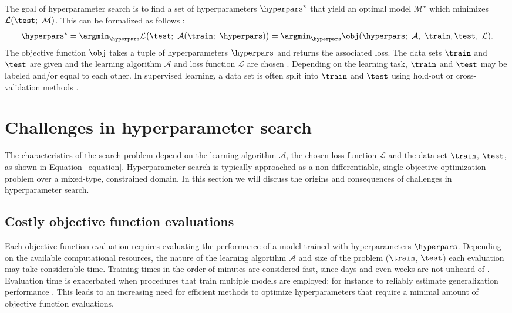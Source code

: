 The goal of hyperparameter search is to find a set of hyperparameters $\hyperpars^\star$ that yield an optimal model $\mathcal{M}^\star$ which minimizes $\mathcal{L}(\test;\ \mathcal{M})$. This can be formalized as follows \citep{claesen2014easy}:
\begin{equation}
\hyperpars^\star = \argmin_{\hyperpars} \mathcal{L}\big(\test;\ \mathcal{A}(\train;\ \hyperpars)\big) = \argmin_{\hyperpars} \obj(\hyperpars;\ \mathcal{A},\ \train, \test,\ \mathcal{L}). \label{equation}
\end{equation}
The objective function $\obj$ takes a tuple of hyperparameters $\hyperpars$ and returns the associated loss. The data sets $\train$ and $\test$ are given and the learning algorithm $\mathcal{A}$ and loss function $\mathcal{L}$ are chosen . Depending on the learning task, $\train$ and $\test$ may be labeled and/or equal to each other. In supervised learning, a data set is often split into $\train$ and $\test$ using hold-out or cross-validation methods \citep{efron1983leisurely,kohavi1995study}.



\section{Challenges in hyperparameter search} \label{challenges}
The characteristics of the search problem depend on the learning algorithm $\mathcal{A}$, the chosen loss function $\mathcal{L}$ and the data set $\train$, $\test$, as shown in Equation~\eqref{equation}. Hyperparameter search is typically approached as a non-differentiable, single-objective optimization problem over a mixed-type, constrained domain. In this section we will discuss the origins and consequences of challenges in hyperparameter search.

\subsection{Costly objective function evaluations} \label{time}
Each objective function evaluation requires evaluating the performance of a model trained with hyperparameters $\hyperpars$. Depending on the available computational resources, the nature of the learning algortihm $\mathcal{A}$ and size of the problem ($\train$, $\test$) each evaluation may take considerable time. Training times in the order of minutes are considered fast, since days and even weeks are not unheard of \citep{krizhevsky2012imagenet, dean2012large, sutskever2014sequence}. Evaluation time is exacerbated when procedures that train multiple models are employed; for instance to reliably estimate generalization performance \citep{efron1983leisurely,kohavi1995study}. This leads to an increasing need for efficient methods to optimize hyperparameters that require a minimal amount of objective function evaluations.

